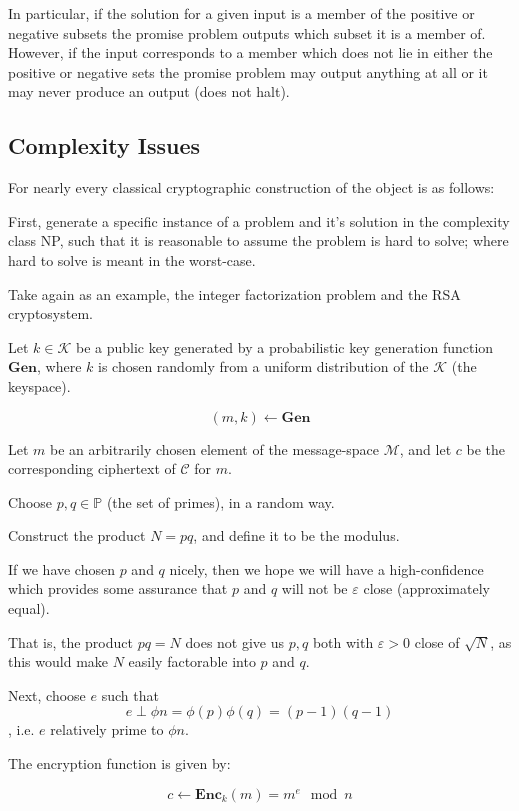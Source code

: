 In particular, if the solution for a given input is a member of the positive or negative subsets the promise problem outputs which subset it is a member of. However, if the input corresponds to a member which does not lie in either the positive or negative sets the promise problem may output anything at all or it may never produce an output (does not halt).



\subsection{Complexity Issues}


For nearly every classical cryptographic construction of the object is as follows:


First, generate a specific instance of a problem and it's solution in the complexity class NP, such that it is reasonable to assume the problem is hard to solve; where hard to solve is meant in the worst-case.


Take again as an example, the integer factorization problem and the RSA cryptosystem. 


Let $k \in \mathcal{K}$ be a public key generated by a probabilistic key generation function $\mathbf{Gen}$, where $k$ is chosen randomly from a uniform distribution of the $\mathcal{K}$ (the keyspace). 
  
  \[ (m,k) \leftarrow \mathbf{Gen} \]
  
Let $m$ be an arbitrarily chosen element of the message-space $\mathcal{M}$, and let $c$ be the corresponding ciphertext of $\mathcal{C}$ for $m$. 
  

Choose $p,q \in \mathbb{P}$ (the set of primes), in a random way.
  
Construct the product $N=pq$, and define it to be the modulus.
  
If we have chosen $p$ and $q$ nicely, then we hope we will have a high-confidence which provides some assurance that $p$ and $q$ will not be $\varepsilon$ close (approximately equal).
  
That is, the product $pq=N$ does not give us $p,q$ both with $\varepsilon > 0$ close of $\sqrt{N}$, as this would make $N$ easily factorable into $p$ and $q$.
  

Next, choose $e$ such that 
\[e \perp \phi{n}=\phi(p)\phi(q)=(p-1)(q-1)\], i.e. $e$ relatively prime to $\phi{n}$.
 

The encryption function is given by: 
 
  \[c \leftarrow \mathbf{Enc}_{k}(m) = m^{e}\mod{n}\]
  
